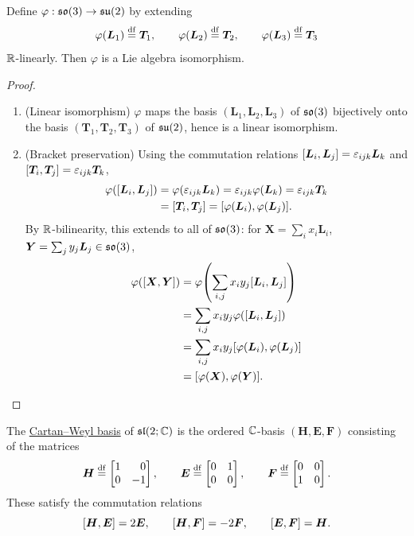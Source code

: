\documentclass[11pt,reqno]{amsart}
\renewcommand{\phi}{\varphi}
\begin{document}
\begin{Thm}\label{thm:so3-su2-isomorphism}
Define $\phi:\so(3)\to\su(2)$ by extending
\[
\phi(\bm L_1)\df \bm T_1,\qquad\phi(\bm L_2)\df \bm T_2,\qquad\phi(\bm L_3)\df \bm T_3
\]
$\mathbb{R}$-linearly.  Then $\phi$ is a Lie algebra isomorphism.
\end{Thm}
\begin{proof}
\begin{enumerate}
\item (Linear isomorphism)
$\phi$ maps the basis $(\bm L_1,\bm L_2,\bm L_3)$ of $\mathfrak{so}(3)$ bijectively onto the
basis $(\bm T_1,\bm T_2,\bm T_3)$ of $\mathfrak{su}(2)$, hence is a linear isomorphism.

\item (Bracket preservation)
Using the commutation relations $\SqBr{\bm L_i,\bm L_j}=\eps_{ijk}\bm L_k$ and
$\SqBr{\bm T_i,\bm T_j}=\eps_{ijk}\bm T_k$,
\[
\begin{aligned}
\phi\Br{\SqBr{\bm L_i,\bm L_j}}
&=\phi\Br{\eps_{ijk}\bm L_k}
=\eps_{ijk}\phi(\bm L_k)
=\eps_{ijk}\bm T_k \\
&=\SqBr{\bm T_i,\bm T_j}
=\SqBr{\phi(\bm L_i),\phi(\bm L_j)}.
\end{aligned}
\]
By $\mathbb{R}$-bilinearity, this extends to all of $\mathfrak{so}(3)$:
for $\bm X=\sum_i x_i \bm L_i$, $\bm Y=\sum_j y_j \bm L_j\in\mathfrak{so}(3)$,
\[\begin{aligned}
\phi\Br{\SqBr{\bm X,\bm Y}}
&=\phi\Br{\sum_{i,j}x_i y_j\SqBr{\bm L_i,\bm L_j}}\\
&=\sum_{i,j}x_i y_j\phi\Br{\SqBr{\bm L_i,\bm L_j}}\\
&=\sum_{i,j}x_i y_j\SqBr{\phi(\bm L_i),\phi(\bm L_j)}\\
&=\SqBr{\phi(\bm X),\phi(\bm Y)}.\\
\end{aligned}\]

\end{enumerate}
\end{proof}


\begin{Def}\label{def:cartan-weyl}
The \ul{Cartan--Weyl basis} of $\mathfrak{sl}(2;\mathbb{C})$ is the ordered
$\mathbb{C}$-basis $(\bm H,\bm E,\bm F)$ consisting of the matrices
\[
\bm H\df\mqty{1&0\\0&-1},\qquad
\bm E\df\mqty{0&1\\0&0},\qquad
\bm F\df\mqty{0&0\\1&0}.
\]
These satisfy the commutation relations
\[
\SqBr{\bm H,\bm E}=2\bm E,\qquad
\SqBr{\bm H,\bm F}=-2\bm F,\qquad
\SqBr{\bm E,\bm F}=\bm H.
\]
\end{Def}
\end{document}
